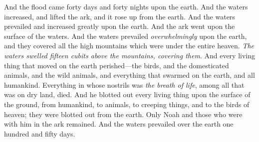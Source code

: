 \begin{biblechapter}
\verse And the flood came forty days and forty nights upon the earth. And the waters increased, and lifted the ark, and it rose up from the earth.
\verse And the waters prevailed and increased greatly upon the earth. And the ark went upon the surface of the waters.
\verse And the waters prevailed \textit{overwhelmingly} upon the earth, and they covered all the high mountains which were under the entire heaven.
\verse \textit{The waters swelled fifteen cubits above the mountains, covering them}.
\verse And every living thing that moved on the earth perished—the birds, and the domesticated animals, and the wild animals, and everything that swarmed on the earth, and all humankind.
\verse Everything in whose nostrils was \textit{the breath of life}, among all that was on dry land, died.
\verse And he blotted out every living thing upon the surface of the ground, from humankind, to animals, to creeping things, and to the birds of heaven; they were blotted out from the earth. Only Noah and those who were with him in the ark remained.
\verse And the waters prevailed over the earth one hundred and fifty days.
\end{biblechapter}

